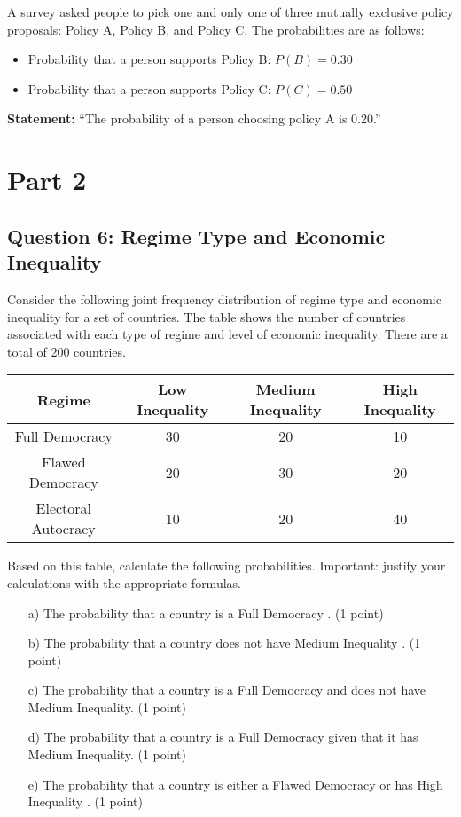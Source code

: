 \documentclass{article}
\begin{document}
A survey asked people to pick one and only one of three mutually exclusive policy proposals: Policy A, Policy B, and Policy C. The probabilities are as follows:
\begin{itemize}
    \item Probability that a person supports Policy B: \( P(B) = 0.30 \)
    \item Probability that a person supports Policy C: \( P(C) = 0.50 \)
\end{itemize}

\textbf{Statement:} ``The probability of a person choosing policy A is 0.20.''

\section*{Part 2}

\subsection*{Question 6: Regime Type and Economic Inequality}

Consider the following joint frequency distribution of regime type and economic inequality for a set of countries. The table shows the number of countries associated with each type of regime and level of economic inequality. There are a total of 200 countries.

\begin{table}[h!]
\centering
\begin{tabular}{|c|c|c|c|}
\hline
Regime & Low Inequality & Medium Inequality & High Inequality \\
\hline
Full Democracy & 30 & 20 & 10 \\ %
\hline
Flawed Democracy & 20 & 30 & 20 \\ %
\hline
Electoral Autocracy  & 10 & 20 & 40 \\ %
\hline
\end{tabular}
\end{table}

Based on this table, calculate the following probabilities. Important: justify your calculations with the appropriate formulas.

\begin{enumerate}
    \item[a)] The probability that a country is a Full Democracy . (1 point)
    \item[b)] The probability that a country does not have Medium Inequality . (1 point)
    \item[c)] The probability that a country is a Full Democracy and does not have Medium Inequality. (1 point)
    \item[d)] The probability that a country is a Full Democracy given that it has Medium Inequality. (1 point)
    \item[e)] The probability that a country is either a Flawed Democracy or has High Inequality . (1 point)
\end{enumerate}
\end{document}

